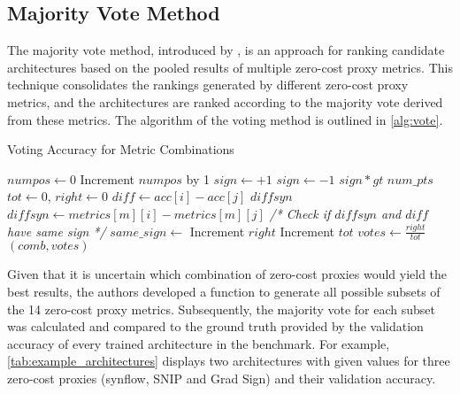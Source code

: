 \subsection{Majority Vote Method}\label{subsec:vote}

The majority vote method, introduced by \cite{abdelfattah2021zero}, is an approach for ranking candidate architectures based on the pooled results of multiple zero-cost proxy metrics. This technique consolidates the rankings generated by different zero-cost proxy metrics, and the architectures are ranked according to the majority vote derived from these metrics. The algorithm of the voting method is outlined in \cref{alg:vote}. 
\clearpage

\begin{algorithm}[h!]
\caption{Voting Accuracy for Metric Combinations}\label{alg:vote}
\begin{algorithmic}[1]
    \State $numpos \leftarrow 0$ 
            \State Increment $numpos$ by 1
        \EndIf
    \EndFor
        \State $sign \leftarrow +1$
    \Else
        \State $sign \leftarrow -1$
    \EndIf
    \State \Return $sign * gt$ 
\EndFunction
\vspace{1em}
    \State $num\_pts$ 
    \State $tot \leftarrow 0$, $right \leftarrow 0$
        \State $diff \leftarrow acc[i] - acc[j]$
            \State $diffsyn$ 
                \State $diffsyn \leftarrow metrics[m][i] - metrics[m][j]$
            \EndFor
            \State \textit{/* Check if $diffsyn$ and $diff$ have same sign */}
            \State $same\_sign \leftarrow$ 
                \State Increment $right$ 
            \EndIf
            \State Increment $tot$
        \EndIf
    \EndFor
    \State $votes \leftarrow \frac{right}{tot}$ 
    \State \Return $(comb, votes)$
\EndFunction
\end{algorithmic}
\end{algorithm}


Given that it is uncertain which combination of zero-cost proxies would yield the best results, the authors developed a function to generate all possible subsets of the 14 zero-cost proxy metrics. Subsequently, the majority vote for each subset was calculated and compared to the ground truth provided by the validation accuracy of every trained architecture in the benchmark. For example, \cref{tab:example_architectures} displays two architectures with given values for three zero-cost proxies (\gls{synflow}, \gls{SNIP} and Grad Sign) and their validation accuracy. 

